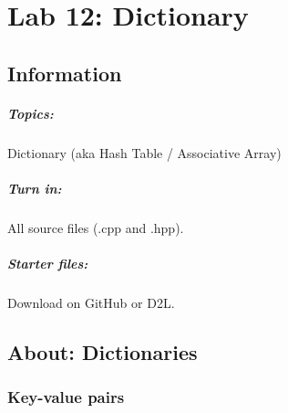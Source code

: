 \documentclass[a4paper,12pt,oneside]{book}
\title{}
\author{Rachel Morris}
\date{\today}
\newcommand{\laLab}{Lab 12: Dictionary\ }
\begin{document}
    \chapter*{\laLab} 

        \section{Information}
            \paragraph{ Topics: } Dictionary (aka Hash Table / Associative Array)
            \paragraph{ Turn in: } All source files (.cpp and .hpp).
            \paragraph{ Starter files: } Download on GitHub or D2L.
        

\renewcommand*\DTstylecomment{\rmfamily\color{green}\textsc}

\begin{framed}
\end{framed}
   

\tableofcontents

\section{About: Dictionaries}

\subsection{Key-value pairs}
\end{document}
